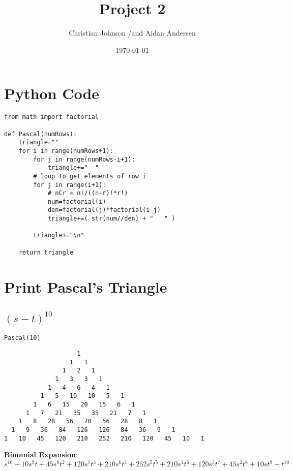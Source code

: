 \documentclass[11pt]{article}
\author{Christian Johnson /and Aidan Andersen}
\date{\today}
\title{Project 2}
\begin{document}
\maketitle
\tableofcontents

\newpage



\section{Python Code}
\label{sec:orga2c43bb}
\begin{verbatim}
from math import factorial

def Pascal(numRows):
    triangle=""
    for i in range(numRows+1):
        for j in range(numRows-i+1):
            triangle+="  "
        # loop to get elements of row i
        for j in range(i+1):
            # nCr = n!/((n-r)!*r!)
            num=factorial(i)
            den=factorial(j)*factorial(i-j)
            triangle+=( str(num//den) + "   " )

        triangle+="\n"

    return triangle
\end{verbatim}

\section{Print Pascal's Triangle}
\label{sec:org8da48fe}

\subsection{\((s-t)^{10}\)}
\label{sec:orge7c80de}

\begin{verbatim}
Pascal(10)
\end{verbatim}

\begin{verbatim}
                    1   
                  1   1   
                1   2   1   
              1   3   3   1   
            1   4   6   4   1   
          1   5   10   10   5   1   
        1   6   15   20   15   6   1   
      1   7   21   35   35   21   7   1   
    1   8   28   56   70   56   28   8   1   
  1   9   36   84   126   126   84   36   9   1   
1   10   45   120   210   252   210   120   45   10   1   
\end{verbatim}

\textbf{Binomial Expansion}:
\(s^{10}+10s^{9}t+45s^{8}t^2+120s^7t^3+210s^6t^4+252s^5t^5+210s^4t^6+120s^3t^7+45s^2t^8+10st^9+t^{10}\)
\end{document}
